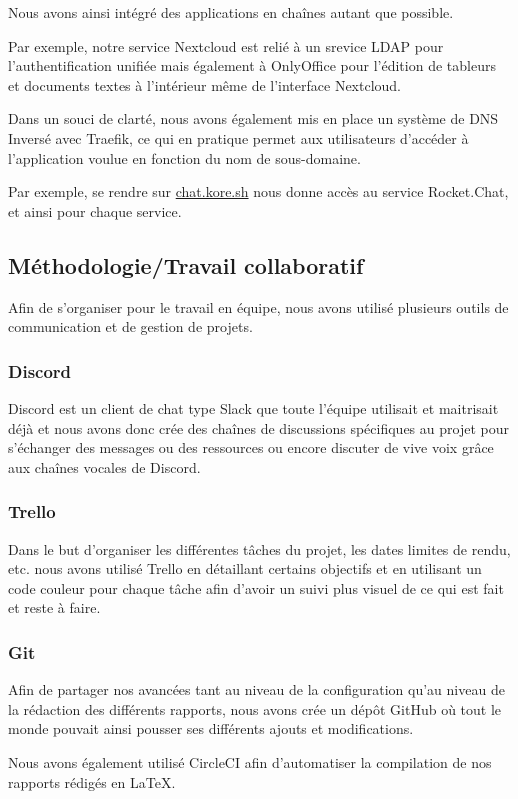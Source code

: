 Nous avons ainsi intégré des applications en chaînes autant que possible.

Par exemple, notre service Nextcloud est relié à un srevice LDAP pour l'authentification unifiée mais également à OnlyOffice pour l'édition de tableurs et documents textes à l'intérieur même de l'interface Nextcloud.

Dans un souci de clarté, nous avons également mis en place un système de DNS Inversé avec Traefik, ce qui en pratique permet aux utilisateurs d'accéder à l'application voulue en fonction du nom de sous-domaine.

Par exemple, se rendre sur \href{http://chat.kore.sh}{chat.kore.sh} nous donne accès au service Rocket.Chat, et ainsi pour chaque service.

\subsection{Méthodologie/Travail collaboratif}

Afin de s'organiser pour le travail en équipe, nous avons utilisé plusieurs outils de communication et de gestion de projets.

\subsubsection{Discord}

Discord est un client de chat type Slack que toute l'équipe utilisait et maitrisait déjà et nous avons donc crée des chaînes de discussions spécifiques au projet pour s'échanger des messages ou des ressources ou encore discuter de vive voix grâce aux chaînes vocales de Discord.

\subsubsection{Trello}

Dans le but d'organiser les différentes tâches du projet, les dates limites de rendu, etc. nous avons utilisé Trello en détaillant certains objectifs et en utilisant un code couleur pour chaque tâche afin d'avoir un suivi plus visuel de ce qui est fait et reste à faire.

\subsubsection{Git}

Afin de partager nos avancées tant au niveau de la configuration qu'au niveau de la rédaction des différents rapports, nous avons crée un dépôt GitHub où tout le monde pouvait ainsi pousser ses différents ajouts et modifications. 

Nous avons également utilisé CircleCI afin d'automatiser la compilation de nos rapports rédigés en \LaTeX .